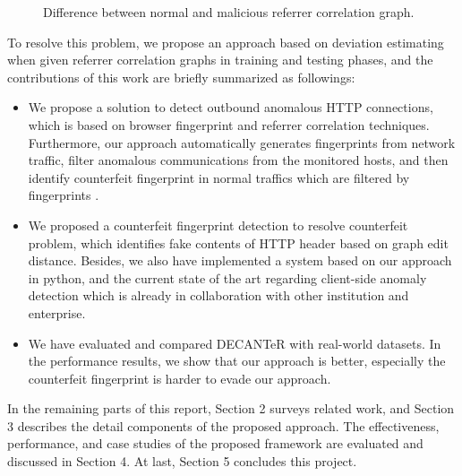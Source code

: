 \begin{figure}[!tbp]
  \centering
  \hfill
  \caption{Difference between normal and malicious referrer correlation graph.}
\label{fig:length_count}
\end{figure}

To resolve this problem, we propose an approach based on deviation estimating when given referrer correlation graphs in training and testing phases, and the contributions of this work are briefly summarized as followings:

\begin{itemize}

\item We propose a solution to detect outbound anomalous HTTP connections, which is based on browser fingerprint and referrer correlation techniques. Furthermore, our approach automatically generates  fingerprints from network traffic, filter anomalous communications from the monitored hosts, and then identify counterfeit fingerprint in normal traffics which are filtered by fingerprints \cite{bortolameotti2017decanter}.

\item We proposed a counterfeit fingerprint detection to resolve counterfeit problem, which identifies fake contents of HTTP header based on graph edit distance. Besides, we also have implemented a system based on our approach in python, and the current state of the art regarding client-side anomaly detection which is already in collaboration with other institution and enterprise. 

\item We have evaluated and compared DECANTeR \cite{bortolameotti2017decanter} with real-world datasets. In the performance results, we show that our approach is better, especially the counterfeit fingerprint is harder to evade our approach.

\end{itemize}

In the remaining parts of this report, Section 2 surveys related work, and Section 3 describes the detail components of the proposed approach. The effectiveness, performance, and case studies of the proposed framework are evaluated and discussed in Section 4. At last, Section 5 concludes this project.
